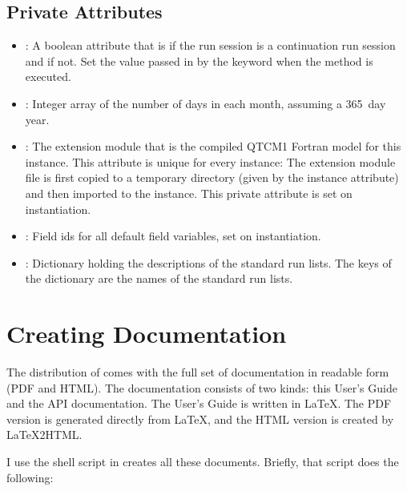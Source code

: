 	\subsection{Private  Attributes}  
					\label{sec:Qtcm.private.attrib}

\begin{itemize}
\item {}:  A boolean attribute that is 
	if the run session is a continuation run session and
	 if not.  Set the value passed in by
	the keyword  when the 
	method is executed.

\item {}:  Integer array of the number of days in 
	each month, assuming a 365~day year.

\item {}:  The extension module that is the
	compiled QTCM1 Fortran model for this instance.
	This attribute is unique for every instance:  The
	extension module  file is first copied to
	a temporary directory (given by the 
	instance attribute) and then imported to the
	 instance.
	This private attribute is set on instantiation.

\item {}:  Field ids for all default 
	field variables, set on instantiation.

\item {}:  Dictionary holding the
	descriptions of the standard run lists.  The keys of
	the dictionary are the names of the standard run lists.
\end{itemize}




\section{Creating Documentation}

The distribution of  comes with the full set of
documentation in readable form (PDF and HTML).  The documentation
consists of two kinds:  this User's Guide and the API documentation.
The User's Guide is written in \LaTeX.  The PDF version is generated
directly from \LaTeX, and the HTML version is created by
\LaTeX{2}HTML.

I use the  shell script in  creates all these
documents.  Briefly, that script does the following:

